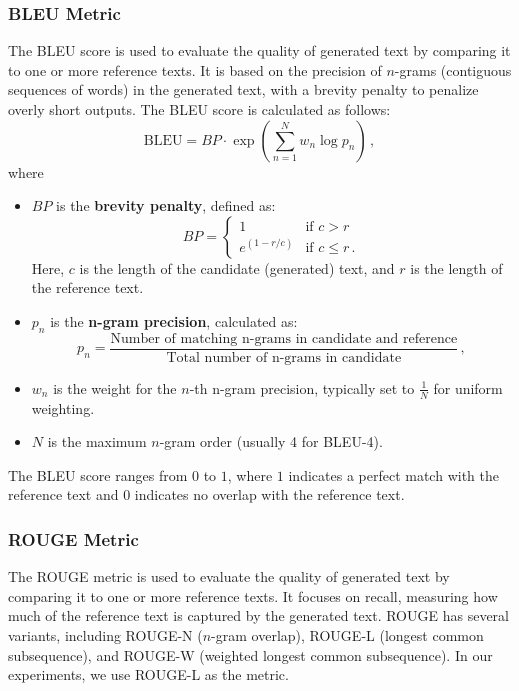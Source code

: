 \subsubsection{BLEU Metric}
\label{belu}
The BLEU score is used to evaluate the quality of generated text by comparing it to one or more reference texts. It is based on the precision of $n$-grams (contiguous sequences of words) in the generated text, with a brevity penalty to penalize overly short outputs.
The BLEU score is calculated as follows:
\[
\text{BLEU} = BP \cdot \exp\left(\sum_{n=1}^{N} w_n \log p_n\right)\,,
\]
where
\begin{itemize}
    \vspace{-0.5em}
    \item \( BP \) is the \textbf{brevity penalty}, defined as:
    \[
    BP = 
    \begin{cases} 
    1 & \text{if } c > r \\
    e^{(1 - r/c)} & \text{if } c \leq r \,.
    \end{cases}
    \]
    Here, \( c \) is the length of the candidate (generated) text, and \( r \) is the length of the reference text.
    \vspace{-0.5em}
    \item \( p_n \) is the \textbf{n-gram precision}, calculated as:
    \[
    p_n = \frac{\text{Number of matching n-grams in candidate and reference}}{\text{Total number of n-grams in candidate}}\,,
    \]
    \vspace{-0.5em}
    \item \( w_n \) is the weight for the \( n \)-th n-gram precision, typically set to \( \frac{1}{N} \) for uniform weighting.
    \vspace{-0.5em}
    \item \( N \) is the maximum $n$-gram order (usually 4 for BLEU-4).
\end{itemize}
The BLEU score ranges from $0$ to $1$, where $1$ indicates a perfect match with the reference text and $0$ indicates no overlap with the reference text.

\subsubsection{ROUGE Metric}
The ROUGE metric is used to evaluate the quality of generated text by comparing it to one or more reference texts. It focuses on recall, measuring how much of the reference text is captured by the generated text. ROUGE has several variants, including ROUGE-N ($n$-gram overlap), ROUGE-L (longest common subsequence), and ROUGE-W (weighted longest common subsequence). 
In our experiments, we use ROUGE-L as the metric.

